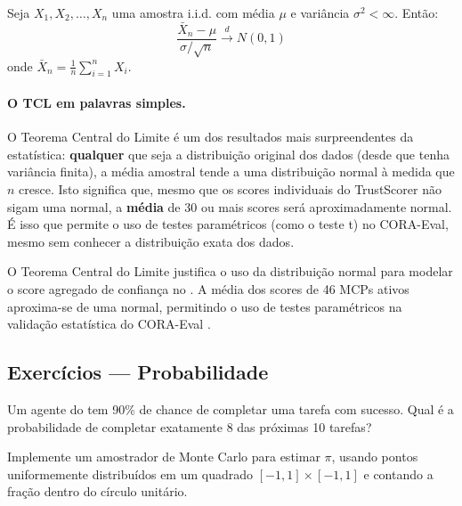 \begin{teorema}
    Seja $X_1, X_2, \ldots, X_n$ uma amostra i.i.d. com média $\mu$ e
    variância $\sigma^2 < \infty$. Então:
    \[
    \frac{\bar{X}_n - \mu}{\sigma / \sqrt{n}} \xrightarrow{d} N(0, 1)
    \]
    onde $\bar{X}_n = \frac{1}{n}\sum_{i=1}^n X_i$.
\end{teorema}

\paragraph{O TCL em palavras simples.} O Teorema Central do Limite é um dos
resultados mais surpreendentes da estatística: \textbf{qualquer} que seja a
distribuição original dos dados (desde que tenha variância finita), a média
amostral tende a uma distribuição normal à medida que $n$ cresce. Isto
significa que, mesmo que os scores individuais do TrustScorer não sigam uma
normal, a \textbf{média} de 30 ou mais scores será aproximadamente normal.
É isso que permite o uso de testes paramétricos (como o teste t) no
CORA-Eval, mesmo sem conhecer a distribuição exata dos dados.

\begin{exemplo}
    O Teorema Central do Limite justifica o uso da distribuição normal para
    modelar o score agregado de confiança no \opencodeeco{}. A média dos
    scores de 46 MCPs ativos aproxima-se de uma normal, permitindo o uso de
    testes paramétricos na validação estatística do CORA-Eval
    \cite{laranjeira2026cora}.
\end{exemplo}

\subsection{Exercícios — Probabilidade}

\begin{exercicio}
    Um agente do \opencodeeco{} tem 90\% de chance de completar uma tarefa
    com sucesso. Qual é a probabilidade de completar exatamente 8 das
    próximas 10 tarefas?
\end{exercicio}

\begin{exercicio}
    Implemente um amostrador de Monte Carlo para estimar $\pi$, usando
    pontos uniformemente distribuídos em um quadrado $[-1,1] \times [-1,1]$
    e contando a fração dentro do círculo unitário.
\end{exercicio}

